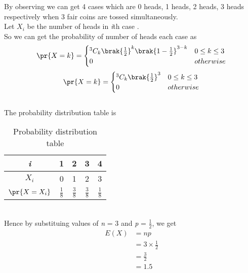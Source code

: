 By observing we can get 4 cases which are 0 heads, 1 heads, 2 heads, 3 heads respectively when 3 fair coins are tossed simultaneously.\\
Let $X_{i}$ be the number of heads in \textit{i}th case .\\
So we can get the probability of number of heads each case  as
\begin{align}
   \pr{X = k} = 
  \begin{cases}
    {^3 C_k}\brak{\frac{1}{2}}^{k}\brak{1-\frac{1}{2}}^{3-k} & 0 \leq k \leq 3\\
    0 & otherwise
  \end{cases}
 \end{align}
 \begin{align}\label{3.5equation-2}
   \pr{X = k} = 
   \begin{cases}
    {^3 C_k}\brak{\frac{1}{2}}^{3} &  0 \leq k \leq 3  \\
    0 & otherwise
  \end{cases}
\end{align}
\\The probability distribution table is \\
\begin{table}[h!]\label{3.5table}
\centering
\begin{tabular}{||c||c||c||c||c||}
\hline\hline
     \textit{i} & 1 & 2 & 3 & 4  \\
     \hline\hline
     $X_{i}$ & 0 & 1 & 2 & 3 \\
     \hline\hline
     $\pr{X = X_{i}}$ & $\frac{1}{8}$ & $\frac{3}{8}$ & $\frac{3}{8}$ & $\frac{1}{8}$\\[1ex]
     \hline\hline
\end{tabular}
\caption{Probability distribution table}
\end{table}
\\Hence by substituing values of \textit{n} = 3 and \textit{p} = $\frac{1}{2}$, we get 
\begin{align}
    E(X) &= np\\
         &= 3 \times \frac{1}{2} \\
         &= \frac{3}{2} \\
         &= 1.5
\end{align}